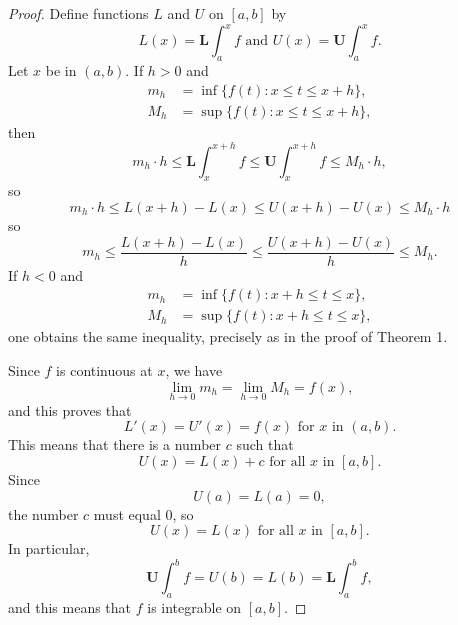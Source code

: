 \documentclass{article}
\begin{document}
\begin{proof}
  Define functions $L$ and $U$ on $[a, b]$ by \begin{equation*}
    L(x) = \textbf{L}\int_a^x f \text{ and } U(x) = \textbf{U}\int_a^x f.
  \end{equation*} Let $x$ be in $(a, b)$. If $h > 0$ and \begin{align*}
    m_h &= \inf\{f(t): x \leq t \leq x + h\}, \\
    M_h &= \sup\{f(t): x \leq t \leq x + h\},
  \end{align*} then \begin{equation*}
    m_h \cdot h \leq \textbf{L}\int_x^{x + h} f \leq \textbf{U}\int_x^{x + h} f
      \leq M_h \cdot h,
  \end{equation*} so \begin{equation*}
    m_h \cdot h \leq L(x + h) - L(x) \leq U(x + h) - U(x) \leq M_h \cdot h
  \end{equation*} so \begin{equation*}
    m_h \leq \frac{L(x + h) - L(x)}{h} \leq \frac{U(x + h) - U(x)}{h} \leq M_h.
  \end{equation*} If $h < 0$ and \begin{align*}
    m_h &= \inf\{f(t): x + h \leq t \leq x\}, \\
    M_h &= \sup\{f(t): x + h \leq t \leq x\},
  \end{align*} one obtains the same inequality, precisely as in the proof of
  Theorem 1.

  Since $f$ is continuous at $x$, we have \begin{equation*}
    \lim_{h \rightarrow 0} m_h = \lim_{h \rightarrow 0} M_h = f(x),
  \end{equation*} and this proves that \begin{equation*}
    L'(x) = U'(x) = f(x) \text{ for } x \text{ in } (a, b).
  \end{equation*} This means that there is a number $c$ such that
  \begin{equation*}
    U(x) = L(x) + c \text{ for all } x \text{ in } [a, b].
  \end{equation*} Since \begin{equation*}
    U(a) = L(a) = 0,
  \end{equation*} the number $c$ must equal 0, so \begin{equation*}
    U(x) = L(x) \text{ for all } x \text{ in } [a, b].
  \end{equation*} In particular, \begin{equation*}
    \textbf{U}\int_a^b f = U(b) = L(b) = \textbf{L}\int_a^b f,
  \end{equation*} and this means that $f$ is integrable on $[a, b]$.
\end{proof}
\end{document}
